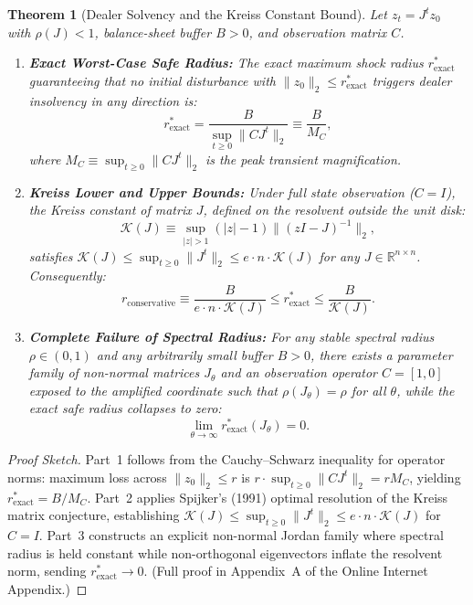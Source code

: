 \documentclass[12pt]{article}
\newtheorem{theorem}{Theorem}[section]
\theoremstyle{definition}
\theoremstyle{remark}
\newcommand{\R}{\mathbb{R}}
\begin{document}
\begin{theorem}[Dealer Solvency and the Kreiss Constant Bound]
\label{thm:m5_kreiss_solvency}
Let $z_t = J^t z_0$ with $\rho(J) < 1$, balance-sheet buffer $B > 0$, and observation matrix $C$.
\begin{enumerate}
    \item \textbf{Exact Worst-Case Safe Radius:} The exact maximum shock radius $r^*_{\text{exact}}$ guaranteeing that no initial disturbance with $\|z_0\|_2 \le r^*_{\text{exact}}$ triggers dealer insolvency in any direction is:
    \begin{equation}
    r^*_{\text{exact}} = \frac{B}{\sup_{t \ge 0} \|C J^t\|_2} \equiv \frac{B}{M_C},
    \label{eq:exact_safe_radius}
    \end{equation}
    where $M_C \equiv \sup_{t \ge 0} \|C J^t\|_2$ is the peak transient magnification.
    \item \textbf{Kreiss Lower and Upper Bounds:} Under full state observation ($C = I$), the Kreiss constant of matrix $J$, defined on the resolvent outside the unit disk:
    \begin{equation}
    \mathcal{K}(J) \equiv \sup_{|z| > 1} (|z| - 1) \|(zI - J)^{-1}\|_2,
    \label{eq:kreiss_def}
    \end{equation}
    satisfies $\mathcal{K}(J) \le \sup_{t \ge 0} \|J^t\|_2 \le e \cdot n \cdot \mathcal{K}(J)$ for any $J \in \R^{n \times n}$. Consequently:
    \begin{equation}
    r_{\text{conservative}} \equiv \frac{B}{e \cdot n \cdot \mathcal{K}(J)} \le r^*_{\text{exact}} \le \frac{B}{\mathcal{K}(J)}.
    \label{eq:kreiss_bilateral_bound}
    \end{equation}
    \item \textbf{Complete Failure of Spectral Radius:} For any stable spectral radius $\rho \in (0, 1)$ and any arbitrarily small buffer $B > 0$, there exists a parameter family of non-normal matrices $J_\theta$ and an observation operator $C = [1, 0]$ exposed to the amplified coordinate such that $\rho(J_\theta) = \rho$ for all $\theta$, while the exact safe radius collapses to zero:
    \begin{equation}
    \lim_{\theta \to \infty} r^*_{\text{exact}}(J_\theta) = 0.
    \end{equation}
\end{enumerate}
\end{theorem}

\begin{proof}[Proof Sketch]
Part~1 follows from the Cauchy--Schwarz inequality for operator norms: maximum loss across $\|z_0\|_2 \le r$ is $r \cdot \sup_{t \ge 0} \|C J^t\|_2 = r M_C$, yielding $r^*_{\text{exact}} = B/M_C$. Part~2 applies Spijker's (1991) optimal resolution of the Kreiss matrix conjecture, establishing $\mathcal{K}(J) \le \sup_{t \ge 0} \|J^t\|_2 \le e \cdot n \cdot \mathcal{K}(J)$ for $C=I$. Part~3 constructs an explicit non-normal Jordan family where spectral radius is held constant while non-orthogonal eigenvectors inflate the resolvent norm, sending $r^*_{\text{exact}} \to 0$. (Full proof in Appendix~A of the Online Internet Appendix.)
\end{proof}
\end{document}
